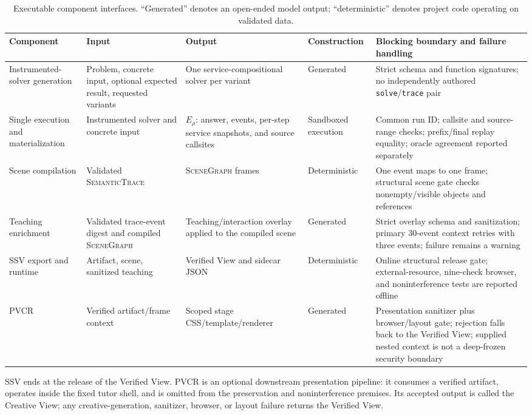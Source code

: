 \documentclass[letterpaper]{article}
\newcommand{\traceir}{\textsc{SemanticTrace}}
\newcommand{\scenegraph}{\textsc{SceneGraph}}
\newcommand{\ssv}{\textsc{SSV}}
\newcommand{\pvcr}{\textsc{PVCR}}
\begin{document}
\begin{table}[t]
\centering
\small
\setlength{\tabcolsep}{3pt}
\begin{tabular}{@{}p{}p{}p{}p{}p{}@{}}
\toprule
Component & Input & Output & Construction & Blocking boundary and failure handling \\
\midrule
Instrumented-solver generation & Problem, concrete input, optional expected result, requested variants & One service-compositional solver per variant & Generated & Strict schema and function signatures; no independently authored \texttt{solve}/\texttt{trace} pair \\
Single execution and materialization & Instrumented solver and concrete input & $E_\rho$: answer, events, per-step service snapshots, and source callsites & Sandboxed execution & Common run ID; callsite and source-range checks; prefix/final replay equality; oracle agreement reported separately \\
Scene compilation & Validated \traceir{} & \scenegraph{} frames & Deterministic & One event maps to one frame; structural scene gate checks nonempty/visible objects and references \\
Teaching enrichment & Validated trace-event digest and compiled \scenegraph{} & Teaching/interaction overlay applied to the compiled scene & Generated & Strict overlay schema and sanitization; primary 30-event context retries with three events; failure remains a warning \\
\ssv{} export and runtime & Artifact, scene, sanitized teaching & Verified View and sidecar JSON & Deterministic & Online structural release gate; external-resource, nine-check browser, and noninterference tests are reported offline \\
\pvcr{} & Verified artifact/frame context & Scoped stage CSS/template/renderer & Generated & Presentation sanitizer plus browser/layout gate; rejection falls back to the Verified View; supplied nested context is not a deep-frozen security boundary \\
\bottomrule
\end{tabular}
\caption{Executable component interfaces. ``Generated'' denotes an open-ended model output; ``deterministic'' denotes project code operating on validated data.}
\label{tab:stage-interfaces}
\end{table}

\ssv{} ends at the release of the Verified View. \pvcr{} is an optional downstream presentation pipeline: it consumes a verified artifact, operates inside the fixed tutor shell, and is omitted from the preservation and noninterference premises. Its accepted output is called the Creative View; any creative-generation, sanitizer, browser, or layout failure returns the Verified View.
\end{document}
